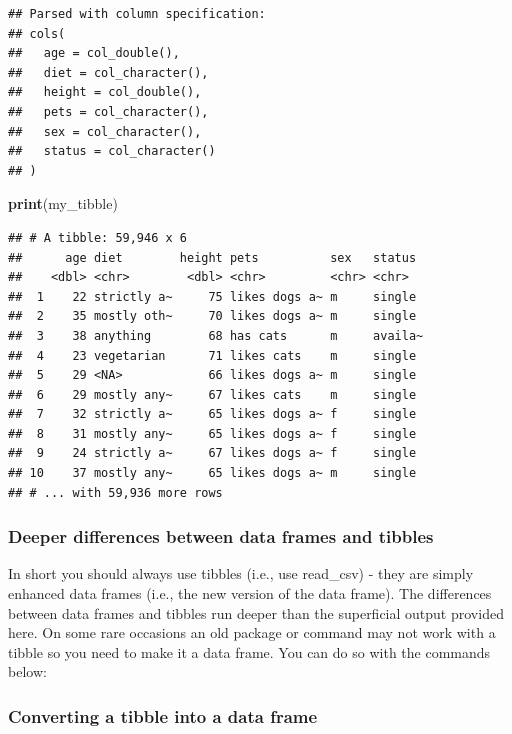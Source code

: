 \documentclass[
]{krantz}
\makeatletter
\newenvironment{Shaded}{\begin{snugshade}}{\end{snugshade}}
\newcommand{\KeywordTok}[1]{\textcolor[rgb]{0.27,0.27,0.27}{\textbf{#1}}}
\newcommand{\NormalTok}[1]{#1}
\newenvironment{kframe}{%
\medskip{}
\setlength{\fboxsep}{.8em}
 \def\at@end@of@kframe{}%
 \ifinner\ifhmode%
  \def\at@end@of@kframe{\end{minipage}}%
  \begin{minipage}{\columnwidth}%
 \fi\fi%
 \def\FrameCommand##1{\hskip\@totalleftmargin \hskip-\fboxsep
 \colorbox{shadecolor}{##1}\hskip-\fboxsep
     \hskip-\linewidth \hskip-\@totalleftmargin \hskip\columnwidth}%
 \MakeFramed {\advance\hsize-\width
   \@totalleftmargin\z@ \linewidth\hsize
   \@setminipage}}%
 {\par\unskip\endMakeFramed%
 \at@end@of@kframe}
\renewenvironment{Shaded}{\begin{kframe}}{\end{kframe}}
\makeatother
\begin{document}
\begin{verbatim}
## Parsed with column specification:
## cols(
##   age = col_double(),
##   diet = col_character(),
##   height = col_double(),
##   pets = col_character(),
##   sex = col_character(),
##   status = col_character()
## )
\end{verbatim}

\begin{Shaded}
\begin{Highlighting}[]
\KeywordTok{print}\NormalTok{(my_tibble)}
\end{Highlighting}
\end{Shaded}

\begin{verbatim}
## # A tibble: 59,946 x 6
##      age diet        height pets          sex   status 
##    <dbl> <chr>        <dbl> <chr>         <chr> <chr>  
##  1    22 strictly a~     75 likes dogs a~ m     single 
##  2    35 mostly oth~     70 likes dogs a~ m     single 
##  3    38 anything        68 has cats      m     availa~
##  4    23 vegetarian      71 likes cats    m     single 
##  5    29 <NA>            66 likes dogs a~ m     single 
##  6    29 mostly any~     67 likes cats    m     single 
##  7    32 strictly a~     65 likes dogs a~ f     single 
##  8    31 mostly any~     65 likes dogs a~ f     single 
##  9    24 strictly a~     67 likes dogs a~ f     single 
## 10    37 mostly any~     65 likes dogs a~ m     single 
## # ... with 59,936 more rows
\end{verbatim}

\hypertarget{deeper-differences-between-data-frames-and-tibbles}{%
\subsubsection{Deeper differences between data frames and tibbles}\label{deeper-differences-between-data-frames-and-tibbles}}

In short you should always use tibbles (i.e., use read\_csv) - they are simply enhanced data frames (i.e., the new version of the data frame). The differences between data frames and tibbles run deeper than the superficial output provided here. On some rare occasions an old package or command may not work with a tibble so you need to make it a data frame. You can do so with the commands below:

\hypertarget{converting-a-tibble-into-a-data-frame}{%
\subsubsection{Converting a tibble into a data frame}\label{converting-a-tibble-into-a-data-frame}}
\end{document}
